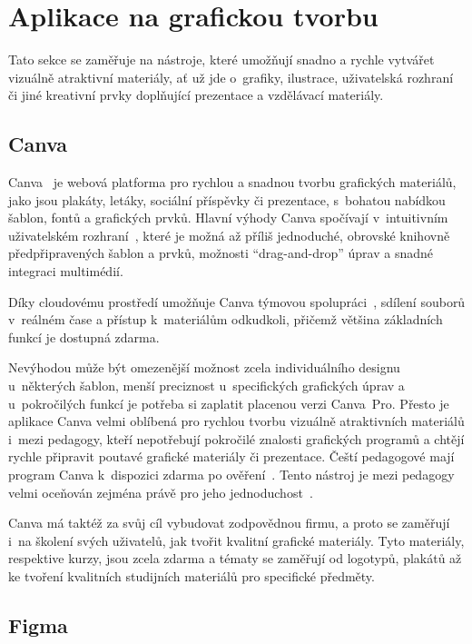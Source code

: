 \section{Aplikace na grafickou tvorbu}\label{text:analyza/grafika}

Tato sekce se zaměřuje na nástroje, které umožňují snadno a rychle vytvářet vizuálně atraktivní materiály, ať už jde o~grafiky, ilustrace, uživatelská rozhraní či jiné kreativní prvky doplňující prezentace a vzdělávací materiály.

\subsection{Canva}\label{text:canva}

Canva~\cite{canva_website} je webová platforma pro rychlou a snadnou tvorbu grafických materiálů, jako jsou plakáty, letáky, sociální příspěvky či prezentace, s~bohatou nabídkou šablon, fontů a grafických prvků. 
Hlavní výhody Canva spočívají v~intuitivním uživatelském rozhraní~\cite{canva_recenze}, které je možná až příliš jednoduché, obrovské knihovně předpřipravených šablon a prvků, možnosti \enquote{drag-and-drop} úprav a snadné integraci multimédií.

Díky cloudovému prostředí umožňuje Canva týmovou spolupráci~\cite{canva_live_help, canva_live_features}, sdílení souborů v~reálném čase a přístup k~materiálům odkudkoli, přičemž většina základních funkcí je dostupná zdarma. 

Nevýhodou může být omezenější možnost zcela individuálního designu u~některých šablon, menší preciznost u~specifických grafických úprav a u~pokročilých funkcí je potřeba si zaplatit placenou verzi Canva~Pro. 
Přesto je aplikace Canva velmi oblíbená pro rychlou tvorbu vizuálně atraktivních materiálů i~mezi pedagogy, kteří nepotřebují pokročilé znalosti grafických programů a chtějí rychle připravit poutavé grafické materiály či prezentace.
Čeští pedagogové mají program Canva k~dispozici zdarma po ověření~\cite{canva_education}. Tento nástroj je mezi pedagogy velmi oceňován zejména právě pro jeho jednoduchost~\cite{canva_facebook}.

Canva má taktéž za svůj cíl vybudovat zodpovědnou firmu, a proto se zaměřují i~na školení svých uživatelů, jak tvořit kvalitní grafické materiály.
Tyto materiály, respektive kurzy, jsou zcela zdarma a tématy se zaměřují od logotypů, plakátů až ke tvoření kvalitních studijních materiálů pro specifické předměty.


\subsection{Figma}\label{text:figma_popis}

